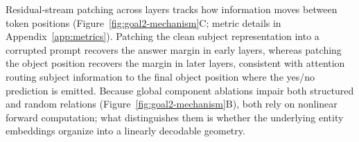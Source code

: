 Residual-stream patching across layers tracks how information moves between
token positions (Figure~\ref{fig:goal2-mechanism}C; metric details in
Appendix~\ref{app:metrics}). Patching the clean subject representation into a
corrupted prompt recovers the answer margin in early layers, whereas patching
the object position recovers the margin in later layers, consistent with
attention routing subject information to the final object position where the
yes/no prediction is emitted. Because global component ablations impair both
structured and random relations (Figure~\ref{fig:goal2-mechanism}B), both rely
on nonlinear forward computation; what distinguishes them is whether the
underlying entity embeddings organize into a linearly decodable geometry.

